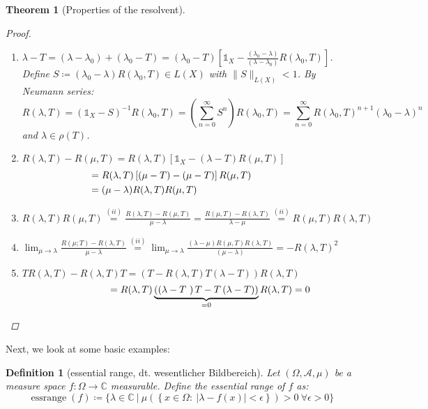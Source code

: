 \documentclass[12pt]{extreport} %
\newcommand{\C}{\mathbb{C}}
\theoremstyle{named}
\theoremstyle{nnamed}
\theoremstyle{itshape}
\newtheorem{definition}{Definition}  \counterwithin{definition}{chapter}
\newtheorem{theorem}{Theorem}  \counterwithin{theorem}{chapter}
\theoremstyle{normal}
\begin{document}
\begin{theorem}[Properties of the resolvent]
	\begin{proof} ~\
		\begin{enumerate}[label=(\roman*\upshape)]
			\item $\lambda - T = \left( \lambda - \lambda_0 \right) + \left( \lambda_0 - T \right) = \left( \lambda_0 - T \right) \left[ \mathds{1}_X - \frac{\left( \lambda_0 - \lambda \right)}{\left( \lambda - \lambda_0 \right)} R(\lambda_0, T) \right]$. ~\\
				Define $S \coloneqq \left( \lambda_0 - \lambda \right) R(\lambda_0, T) \in L(X)$ with $\|S \|_{L(X)} < 1$. By Neumann series:
				$$ R(\lambda, T) = \left( \mathds{1}_X - S \right)^{-1} R(\lambda_0, T) = \left( \sum_{n=0}^{\infty} S^n \right) R(\lambda_0, T) = \sum_{n=0}^\infty R(\lambda_0, T)^{n+1} \left( \lambda_0 - \lambda \right)^n $$
				and $\lambda \in \rho(T)$.
			\item $R(\lambda, T) - R(\mu, T) = R(\lambda, T) \left[ \mathds{1}_X - \left( \lambda - T \right) R(\mu, T) \right]$
				\begin{align*}
					 & = R(\lambda, T) \left[ \left( \mu - T \right) - \left( \mu - T \right) \right] R(\mu, T) ~\hspace{1.3cm} \\
					& = (\mu - \lambda) R(\lambda, T) R(\mu, T)
				\end{align*}
			\item $R(\lambda, T) R(\mu, T) \overset{(ii)}{=} \frac{R(\lambda, T) - R(\mu, T)}{\mu - \lambda} = \frac{R(\mu, T) - R(\lambda, T)}{\lambda - \mu} \overset{(ii)}{=} R(\mu, T) R(\lambda, T)$
			\item $\lim_{\mu \rightarrow \lambda} \frac{R(\mu; T) - R(\lambda, T)}{\mu - \lambda} \overset{(ii)}{=} \lim_{\mu \rightarrow \lambda} \frac{\left( \lambda - \mu \right) R(\mu, T) R(\lambda, T)}{\left( \mu - \lambda \right)} = - R(\lambda, T)^2$
			\item $T R(\lambda, T) - R(\lambda, T) T = \left( T - R(\lambda, T) T(\lambda - T) \right) R(\lambda, T) $
				$$ \hspace{1.5cm} = R(\lambda, T) \underbrace{\left( \left( \lambda - T \right) T - T \left( \lambda - T \right) \right)}_{= 0} R(\lambda, T) = 0$$
		\end{enumerate}
	\end{proof}
\end{theorem}

Next, we look at some basic examples:

\begin{definition}[essential range, dt. wesentlicher Bildbereich]
	Let $(\Omega, \mathcal{A}, \mu)$ be a measure space $f \colon \Omega \rightarrow \C$ measurable. Define the essential range of $f$ as:
	$$ \operatorname{essrange}(f) \coloneqq \big\{ \lambda \in \C ~|~\mu\left( \left\{ x \in \Omega \colon ~|\lambda - f(x)| < \epsilon \right\} \right) > 0 ~\forall \epsilon > 0 \big\} $$ 
\end{definition}
\end{document}

